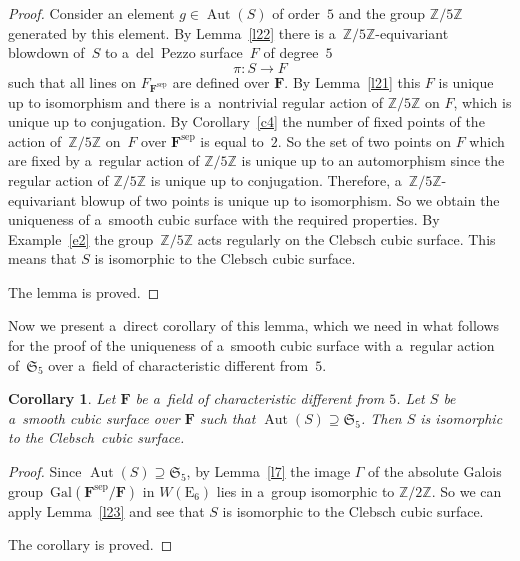 \documentclass{amsart}
\numberwithin{equation}{section}
\theoremstyle{plain}
\newtheorem{corollary}{Corollary}
\theoremstyle{definition}
\theoremstyle{remark}
\begin{document}
\begin{proof}
Consider an element $g \in \operatorname{Aut}(S)$ of order~$5$ and the group $\mathbb{Z}/5\mathbb{Z}$ generated by this element. By Lemma~\ref{l22} there is a~$\mathbb{Z}/5\mathbb{Z}$-equivariant blowdown of~$S$ to a~del~Pezzo surface~$F$ of degree~$5$
$$
\pi \colon S \to F
$$
such that all lines on $F_{\mathbf{F}^{\mathrm{sep}}}$ are defined over $\mathbf{F}$. By Lemma~\ref{l21} this $F$ is unique up to isomorphism and there is a~nontrivial regular action of $\mathbb{Z}/5\mathbb{Z}$ on $F$, which is unique up to conjugation. By Corollary~\ref{c4} the number of fixed points of the action of~$\mathbb{Z}/5\mathbb{Z}$ on~$F$ over $\mathbf{F}^{\mathrm{sep}}$ is equal to~$2$. So the set of two points on $F$ which are fixed by a~regular action of $\mathbb{Z}/5\mathbb{Z}$ is unique up to an automorphism since the regular action of $\mathbb{Z}/5\mathbb{Z}$ is unique up to conjugation. Therefore, a~$\mathbb{Z}/5\mathbb{Z}$-equivariant blowup of two points is unique up to isomorphism. So we obtain the uniqueness of a~smooth cubic surface with the required properties. By Example~\ref{e2} the group~$\mathbb{Z}/5\mathbb{Z}$ acts regularly on the Clebsch cubic surface. This means that $S$ is isomorphic to the Clebsch cubic surface.

The lemma is proved.
\end{proof}

Now we present a~direct corollary of this lemma, which we need in what follows for the proof of the uniqueness of a~smooth cubic surface with a~regular action of~$\mathfrak{S}_5$ over a~field of characteristic different from~$5$.

\begin{corollary}
\label{c5}
Let $\mathbf{F}$ be a~field of characteristic different from $5$. Let $S$ be a~smooth cubic surface over $\mathbf{F}$ such that $\operatorname{Aut}(S) \supseteq \mathfrak{S}_5$. Then $S$ is isomorphic to the Clebsch~cubic surface.
\end{corollary}

\begin{proof}
Since $\operatorname{Aut}(S) \supseteq \mathfrak{S}_5$, by Lemma~\ref{l7} the image $\Gamma$ of the absolute Galois group~$\mathrm{Gal}(\mathbf{F}^{\mathrm{sep}}/\mathbf{F})$ in $W(\mathrm{E}_6)$ lies in a~group isomorphic to $\mathbb{Z}/2\mathbb{Z}$. So we can apply Lemma~\ref{l23} and see that $S$
is isomorphic to the Clebsch cubic surface.

The corollary is proved.
\end{proof}
\end{document}
